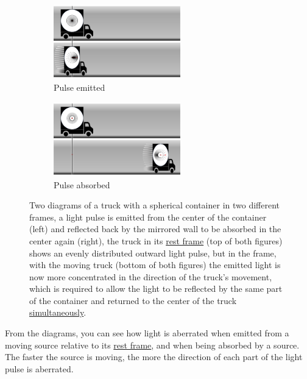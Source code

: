 \begin{figure}[htbp]
	\centering
	\begin{subfigure}{.49\textwidth}
		\centering
		\includegraphics[width = 5.5cm]{images/pdf/Aberrated_lorrys_1.pdf}
		\caption{Pulse emitted}
		\label{fig: truck aberrated 1}
	\end{subfigure}
	\begin{subfigure}{.49\textwidth}
		\centering
		\includegraphics[width = 5.5cm]{images/pdf/Aberrated_lorrys_2.pdf}
		\caption{Pulse absorbed}
		\label{fig: truck aberrated 2}
	\end{subfigure}
	\caption{Two diagrams of a truck with a spherical container in two different frames, a light pulse is emitted from the center of the container (left) and reflected back by the mirrored wall to be absorbed in the center again (right), the truck in its \protect\hyperlink{def-proper-frame}{rest frame} (top of both figures) shows an evenly distributed outward light pulse, but in the frame, with the moving truck (bottom of both figures) the emitted light is now more concentrated in the direction of the truck's movement, which is required to allow the light to be reflected by the same part of the container and returned to the center of the truck \protect\hyperlink{def-simultaneity}{simultaneously}.}
	\label{fig: truck aberrated}
\end{figure}

%

From the diagrams, you can see how light is aberrated when emitted from a moving source relative to its \hyperlink{def-proper-frame}{rest frame}, and when being absorbed by a source. The faster the source is moving, the more the direction of each part of the light pulse is aberrated.

